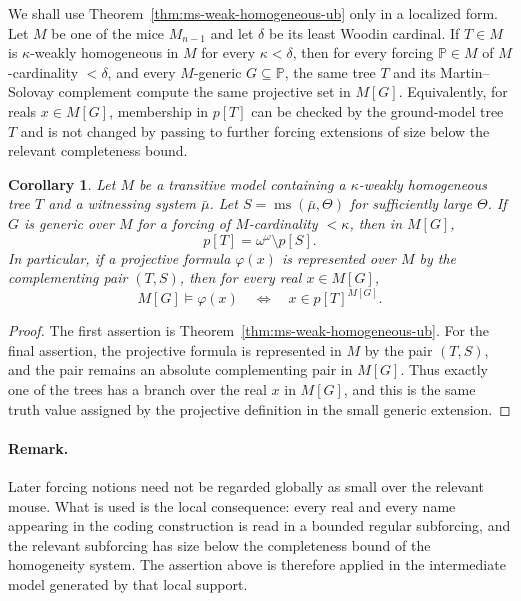 \documentclass[a4paper,11pt]{article}
\newtheorem{corollary}[theorem]{Corollary}
\begin{document}
We shall use Theorem~\ref{thm:ms-weak-homogeneous-ub} only in a localized form.  Let $M$ be one of the mice $M_{n-1}$ and let $\delta$ be its least Woodin cardinal.  If $T\in M$ is $\kappa$-weakly homogeneous in $M$ for every $\kappa<\delta$, then for every forcing $\mathbb P\in M$ of $M$-cardinality $<\delta$, and every $M$-generic $G\subseteq\mathbb P$, the same tree $T$ and its Martin--Solovay complement compute the same projective set in $M[G]$.  Equivalently, for reals $x\in M[G]$, membership in $p[T]$ can be checked by the ground-model tree $T$ and is not changed by passing to further forcing extensions of size below the relevant completeness bound.

\begin{corollary}\label{cor:small-generic-absoluteness-fixed-tree}
Let $M$ be a transitive model containing a $\kappa$-weakly homogeneous tree $T$ and a witnessing system $\bar\mu$.  Let $S=\operatorname{ms}(\bar\mu,\Theta)$ for sufficiently large $\Theta$.  If $G$ is generic over $M$ for a forcing of $M$-cardinality $<\kappa$, then in $M[G]$,
\[
   p[T]=\omega^\omega\setminus p[S].
\]
In particular, if a projective formula $\varphi(x)$ is represented over $M$ by the complementing pair $(T,S)$, then for every real $x\in M[G]$,
\[
   M[G]\models \varphi(x)
   \quad\Longleftrightarrow\quad
   x\in p[T]^{M[G]} .
\]
\end{corollary}

\begin{proof}
The first assertion is Theorem~\ref{thm:ms-weak-homogeneous-ub}.  For the final assertion, the projective formula is represented in $M$ by the pair $(T,S)$, and the pair remains an absolute complementing pair in $M[G]$.  Thus exactly one of the trees has a branch over the real $x$ in $M[G]$, and this is the same truth value assigned by the projective definition in the small generic extension.
\end{proof}

\paragraph{Remark.}\label{rem:localized-smallness-of-absoluteness}
Later forcing notions need not be regarded globally as small over the relevant mouse.  What is used is the local consequence: every real and every name appearing in the coding construction is read in a bounded regular subforcing, and the relevant subforcing has size below the completeness bound of the homogeneity system.  The assertion above is therefore applied in the intermediate model generated by that local support.
\end{document}
